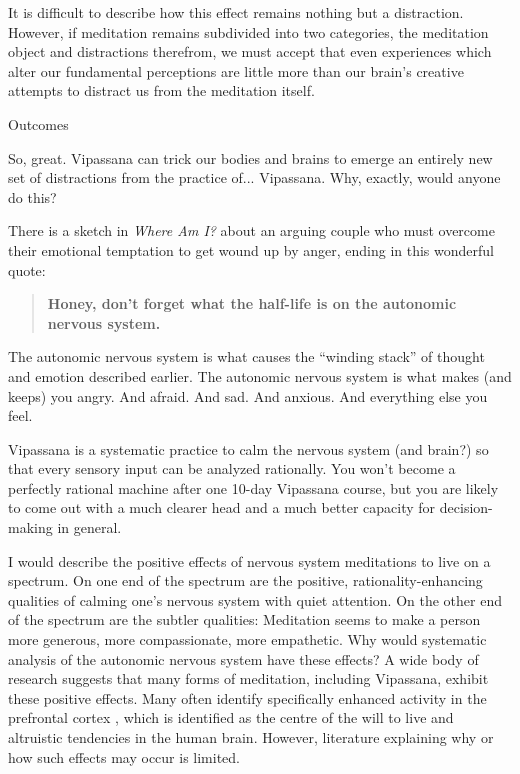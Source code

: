 \documentclass{article}
\begin{document}
It is difficult to describe how this effect remains nothing but a distraction. However, if meditation remains subdivided into two categories, the meditation object and distractions therefrom, we must accept that even experiences which alter our fundamental perceptions are little more than our brain's creative attempts to distract us from the meditation itself.


\pagebreak

\begin{center}
  \Huge{Outcomes}
\end{center}

So, great. Vipassana can trick our bodies and brains to emerge an entirely new set of distractions from the practice of... Vipassana. Why, exactly, would anyone do this?

There is a sketch in \textit{Where Am I?} \cite{whereami} about an arguing couple who must overcome their emotional temptation to get wound up by anger, ending in this wonderful quote:

\begin{quote}
  \textbf{Honey, don’t forget what the half-life is on the autonomic nervous system.}
\end{quote}

The autonomic nervous system is what causes the ``winding stack'' of thought and emotion described earlier. The autonomic nervous system is what makes (and keeps) you angry. And afraid. And sad. And anxious. And everything else you feel.

Vipassana is a systematic practice to calm the nervous system (and brain?) so that every sensory input can be analyzed rationally. You won't become a perfectly rational machine after one 10-day Vipassana course, but you are likely to come out with a much clearer head and a much better capacity for decision-making in general.

I would describe the positive effects of nervous system meditations to live on a spectrum. On one end of the spectrum are the positive, rationality-enhancing qualities of calming one's nervous system with quiet attention. On the other end of the spectrum are the subtler qualities: Meditation seems to make a person more generous, more compassionate, more empathetic. Why would systematic analysis of the autonomic nervous system have these effects? A wide body of research suggests that many forms of meditation, including Vipassana, exhibit these positive effects. Many often identify specifically enhanced activity in the prefrontal cortex \cite{differentialengagement, meditationbrainstructure}, which is identified as the centre of the will to live and altruistic tendencies in the human brain.\cite{personalityneuroscience} However, literature explaining why or how such effects may occur is limited.
\end{document}
